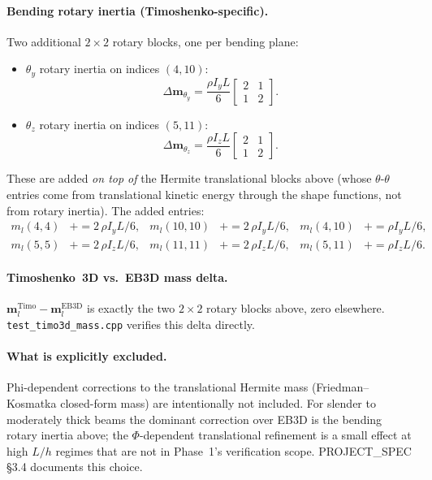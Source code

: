 \documentclass[11pt,a4paper]{article}
\newcommand{\bmath}[1]{\boldsymbol{#1}}
\begin{document}
\paragraph{Bending rotary inertia (Timoshenko-specific).}
Two additional $2\times 2$ rotary blocks, one per bending plane:
\begin{itemize}
    \item $\theta_y$ rotary inertia on indices $(4, 10)$:
    \[
    \Delta\bmath{m}_{\theta_y} = \dfrac{\rho I_y L}{6}\begin{bmatrix} 2 & 1 \\ 1 & 2 \end{bmatrix}.
    \]
    \item $\theta_z$ rotary inertia on indices $(5, 11)$:
    \[
    \Delta\bmath{m}_{\theta_z} = \dfrac{\rho I_z L}{6}\begin{bmatrix} 2 & 1 \\ 1 & 2 \end{bmatrix}.
    \]
\end{itemize}
These are added \emph{on top of} the Hermite translational blocks above (whose $\theta$-$\theta$ entries come from translational kinetic energy through the shape functions, not from rotary inertia). The added entries:
\begin{align*}
m_l(4,4)   &\mathrel{+}= 2\,\rho I_y L / 6,
& m_l(10,10) &\mathrel{+}= 2\,\rho I_y L / 6,
& m_l(4,10)  &\mathrel{+}= \rho I_y L / 6, \\
m_l(5,5)   &\mathrel{+}= 2\,\rho I_z L / 6,
& m_l(11,11) &\mathrel{+}= 2\,\rho I_z L / 6,
& m_l(5,11)  &\mathrel{+}= \rho I_z L / 6.
\end{align*}

\paragraph{Timoshenko~3D vs.\ EB3D mass delta.}
$\bmath{m}_l^{\text{Timo}} - \bmath{m}_l^{\text{EB3D}}$ is exactly the two $2\times 2$ rotary blocks above, zero elsewhere. \texttt{test\_timo3d\_mass.cpp} verifies this delta directly.

\paragraph{What is explicitly excluded.}
Phi-dependent corrections to the translational Hermite mass (Friedman--Kosmatka closed-form mass) are intentionally not included. For slender to moderately thick beams the dominant correction over EB3D is the bending rotary inertia above; the $\Phi$-dependent translational refinement is a small effect at high $L/h$ regimes that are not in Phase~1's verification scope. PROJECT\_SPEC \S3.4 documents this choice.
\end{document}
